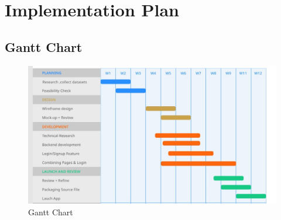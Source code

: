 \chapter {Implementation Plan}
\section{Gantt Chart}
\begin{figure}[H]
\includegraphics[width=180mm]{./img/gantt.jpg}
\caption{Gantt Chart}
\end{figure}
